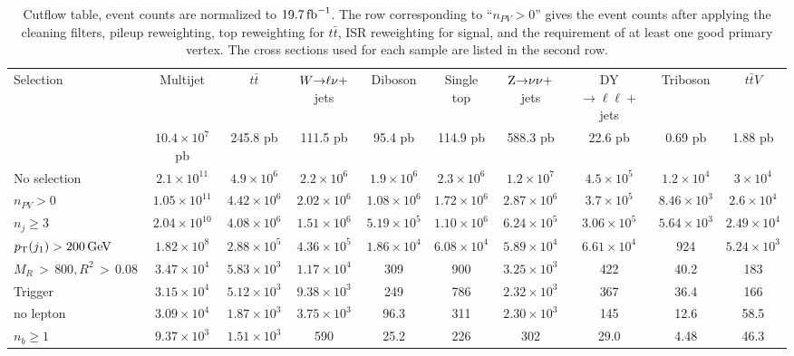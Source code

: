 \begin{sidewaystable}[p]
\centering
\caption{Cutflow table, event counts are normalized to $19.7\mbox{\ensuremath{\,\text{fb}^\text{$-$1}}}$. The row corresponding to
``$n_{PV} > 0$'' gives the event counts after applying the
cleaning filters, pileup reweighting, top \pt reweighting for $t\bar{t}$, ISR reweighting for
signal, and the requirement of at least one good primary vertex. 
The cross sections used for each sample are listed in the second row.}
\vspace{1eM}
{\scriptsize
\begin{tabular}{ l | c  c  c  c  c  c  c  c  c }
\toprule
Selection & Multijet & $t\bar{t}$ & $W{\rightarrow}\ell\nu+$jets & Diboson & Single top &
$\mathrm{Z}{\rightarrow}\nu\nu+$jets & DY${\rightarrow}\ell\ell+$jets & Triboson & $t\bar{t}V$ \\ 
 & $10.4\times 10^7$ pb & 245.8 pb & 111.5 pb & 95.4 pb & 114.9 pb & 588.3 pb & 22.6 pb & 0.69 pb &
1.88 pb \\ 
 \midrule
No selection & $2.1\times 10^{11}$ & $4.9\times 10^6$ & $2.2\times 10^6$ & $1.9\times 10^6$ &
$2.3\times 10^6$ & $1.2\times 10^7$ & $4.5\times 10^5$ & $1.2\times 10^4$ & $3\times 10^4$ \\
$n_{PV} > 0$ & $1.05\times 10^{11}$ & $4.42\times 10^6$ & $2.02\times 10^6$ & $1.08\times 10^6$ &
$1.72\times 10^6$ & $2.87\times 10^6$ & $3.7\times 10^5$ & $8.46\times 10^3$ & $2.6\times 10^4$ \\
$n_j \geq 3$ & $2.04\times 10^{10}$ & $4.08\times 10^6$ & $1.51\times 10^6$ & $5.19\times 10^5$ & 
$1.10\times 10^6$ & $6.24\times 10^5$ & $3.06\times 10^5$ & $5.64\times 10^3$ & $2.49\times 10^4$ \\
$p_{\mathrm{T}}(j_1) > 200\,\text{Ge\hspace{-.08em}V}$ & $1.82\times 10^8$ & $2.88\times 10^5$ & $4.36\times 10^5$ & $1.86\times 10^4$
& $6.08\times 10^4$ & $5.89\times 10^4$ & $6.61\times 10^4$ & 924 & $5.24\times 10^3$ \\
$M_R \,{>}\, 800, R^2 \,{>}\, 0.08$ & $3.47\times 10^4$ & $5.83\times 10^3$ & $1.17\times 10^4$ &
309 & 900 & $3.25\times 10^3$ & 422 & 40.2 & 183 \\
Trigger & $3.15\times 10^4$ & $5.12\times 10^3$ & $9.38\times 10^3$ & 249 & 786 & $2.32\times 10^3$
& 367 & 36.4 & 166 \\
\midrule
no lepton & $3.09\times 10^4$ & $1.87\times 10^3$ & $3.75\times 10^3$ & 96.3 & 311 & $2.30\times
10^3$ & 145 & 12.6 & 58.5  \\
\midrule[.02em]
$n_b \geq 1$ & $9.37\times 10^3$ & $1.51\times 10^3$ & 590 & 25.2 & 226 & 302 & 29.0 & 4.48 & 46.3\\

\end{tabular}}
\end{sidewaystable}
